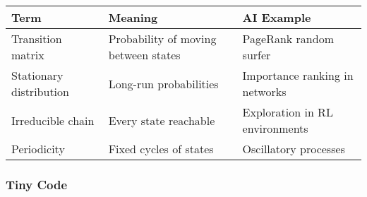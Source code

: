 \documentclass[
  letterpaper,
  DIV=11,
  numbers=noendperiod]{scrreprt}
\begin{document}
\begin{longtable}[]{@{}
  >{\raggedright\arraybackslash}p{}
  >{\raggedright\arraybackslash}p{}
  >{\raggedright\arraybackslash}p{}@{}}
\toprule\noalign{}
\begin{minipage}[b]{\linewidth}\raggedright
Term
\end{minipage} & \begin{minipage}[b]{\linewidth}\raggedright
Meaning
\end{minipage} & \begin{minipage}[b]{\linewidth}\raggedright
AI Example
\end{minipage} \\
\midrule\noalign{}
\endhead
\bottomrule\noalign{}
\endlastfoot
Transition matrix & Probability of moving between states & PageRank
random surfer \\
Stationary distribution & Long-run probabilities & Importance ranking in
networks \\
Irreducible chain & Every state reachable & Exploration in RL
environments \\
Periodicity & Fixed cycles of states & Oscillatory processes \\
\end{longtable}

\subsubsection{Tiny Code}\label{tiny-code-174}
\end{document}
